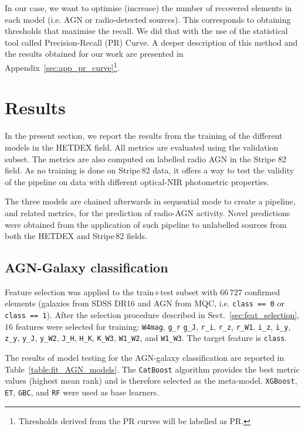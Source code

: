 \documentclass{aa}
\begin{document}
In our case, we want to optimise (increase) the number of recovered elements in each model (i.e. AGN or radio-detected sources). This corresponds to obtaining thresholds that maximise the recall. We did that with the use of the statistical tool called Precision-Recall (PR) Curve. A deeper description of this method and the results obtained for our work are presented in Appendix~\ref{sec:app_pr_curve}\footnote{Thresholds derived from the PR curves will be labelled as PR.}.



\section{Results}\label{sec:results}
In the present section, we report the results from the training of the different models in the HETDEX field. All metrics are evaluated using the validation subset. The metrics are also computed on labelled radio AGN in the Stripe 82 field. As no training is done on Stripe\,82 data, it offers a way to test the validity of the pipeline on data with different optical-NIR photometric properties.

The three models are chained afterwards in sequential mode to create a pipeline, and related metrics, for the prediction of radio-AGN activity. Novel predictions were obtained from the application of such pipeline to unlabelled sources from both the HETDEX and Stripe\,82 fields. 

\subsection{AGN-Galaxy classification}\label{sec:results_agn}
Feature selection was applied to the train+test subset with $66\,727$ confirmed elements (galaxies from SDSS DR16 and AGN from MQC, i.e. \texttt{class == 0} or \texttt{class == 1}). After the selection procedure described in Sect.~\ref{sec:feat_selection}, $16$ features were selected for training: \verb|W4mag|, \verb|g_r| \verb|g_J|, \verb|r_i|, \verb|r_z|, \verb|r_W1|, \verb|i_z|, \verb|i_y|, \verb|z_y|, \verb|y_J|, \verb|y_W2|, \verb|J_H|, \verb|H_K|, \verb|K_W3|, \verb|W1_W2|, and \verb|W1_W3|. The target feature is \verb|class|.

The results of model testing for the AGN-galaxy classification are reported in Table~\ref{table:fit_AGN_models}. The \verb|CatBoost| algorithm provides the best metric values (highest mean rank) and is therefore selected as the  meta-model. \verb|XGBoost|, \verb|ET|, \verb|GBC|, and \verb|RF| were used as base learners.
\end{document}

